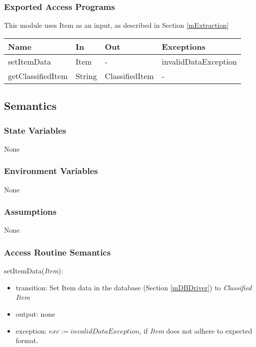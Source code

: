 \documentclass[12pt, titlepage]{article}
\begin{document}
\subsubsection{Exported Access Programs}

This module uses Item as an input, as described in Section \ref{mExtraction}

\begin{center}
    \begin{tabular}{p{5cm} p{4cm} p{3cm} p{4cm}}
    \hline
    \textbf{Name} & \textbf{In} & \textbf{Out} & \textbf{Exceptions} \\
    \hline
    setItemData & Item & - & invalidDataException \\
    getClassifiedItem & String & ClassifiedItem & - \\
    \hline
    \end{tabular}
\end{center}

\subsection{Semantics}

\subsubsection{State Variables}

None

\subsubsection{Environment Variables}

None

\subsubsection{Assumptions}

None

\subsubsection{Access Routine Semantics}

\noindent setItemData(\textit{Item}):
\begin{itemize}
  \item transition: Set Item data in the database (Section \ref{mDBDriver}) to \textit{Classified Item}
  \item output: none
  \item exception: $exc := invalidDataException$, if \textit{Item} does not adhere to expected format.
  \end{itemize}
\end{document}

